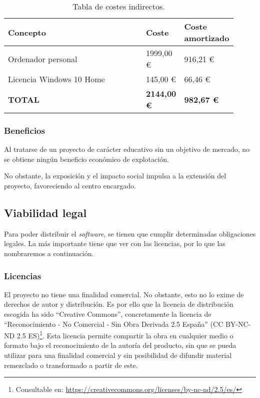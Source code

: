 \begin{table}[H]
	\centering
	\begin{tabular}{>{\raggedright}m{0.6\linewidth}>{\raggedleft}m{0.16\linewidth}>{\raggedleft\arraybackslash}m{0.15\linewidth}}
		\toprule
		\textbf{{Concepto}}  & \textbf{{Coste}} & \textbf{{Coste amortizado}} \\
		\midrule
		\small{\scriptsize Ordenador personal} & \small{1999,00 €} & \small{916,21 €} \\
		\small{\scriptsize Licencia Windows 10 Home} & \small{145,00 €} & \small{66,46 €} \\
		\bottomrule
		\textbf{{\scriptsize TOTAL}}  & \textbf{\small 2144,00 €} & \textbf{\small 982,67 €} \\
		\bottomrule
	\end{tabular}
	\caption{Tabla de costes indirectos.}
\end{table}

\subsubsection{Beneficios}

Al tratarse de un proyecto de carácter educativo sin un objetivo de mercado, no se obtiene ningún beneficio económico de explotación. 

No obstante, la exposición y el impacto social impulsa a la extensión del proyecto, favoreciendo al centro encargado.

\subsection{Viabilidad legal}

Para poder distribuir el \textit{software}, se tienen que cumplir determinadas obligaciones legales. La más importante tiene que ver con las licencias, por lo que las nombraremos a continuación.

\subsubsection{Licencias}

El proyecto no tiene una finalidad comercial. No obstante, esto no lo exime de derechos de autor y distribución. Es por ello que la licencia de distribución escogida ha sido ``Creative Commons'', concretamente la licencia de ``Reconocimiento - No Comercial - Sin Obra Derivada 2.5 España'' (CC BY-NC-ND 2.5 ES)\footnote{Consultable en: \url{https://creativecommons.org/licenses/by-nc-nd/2.5/es/}}. Esta licencia permite compartir la obra en cualquier medio o formato bajo el reconocimiento de la autoría del producto, sin que se pueda utilizar para una finalidad comercial y sin posibilidad de difundir material remezclado o transformado a partir de este.

